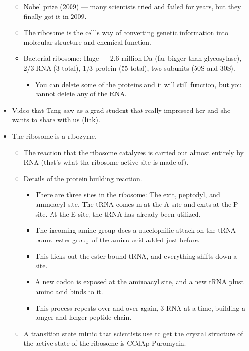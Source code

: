 \documentclass[../notes.tex]{subfiles}
\begin{document}
\begin{itemize}
    \begin{itemize}
        \item Nobel prize (2009) --- many scientists tried and failed for years, but they finally got it in 2009.
        \item The ribosome is the cell's way of converting genetic information into molecular structure and chemical function.
        \item Bacterial ribosome: Huge --- 2.6 million Da (far bigger than glycosylase), 2/3 RNA (3 total), 1/3 protein (55 total), two subunits (50S and 30S).
        \begin{itemize}
            \item You can delete some of the proteins and it will still function, but you cannot delete any of the RNA.
        \end{itemize}
    \end{itemize}
    \item Video that Tang saw as a grad student that really impressed her and she wants to share with us (\href{https://youtu.be/RedO6rLNQ2o}{link}).
    \item The ribosome is a ribozyme.
    \begin{itemize}
        \item The reaction that the ribosome catalyzes is carried out almost entirely by RNA (that's what the ribosome active site is made of).
        \item Details of the protein building reaction.
        \begin{itemize}
            \item There are three sites in the ribosome: The exit, peptodyl, and aminoacyl site. The tRNA comes in at the A site and exits at the P site. At the E site, the tRNA has already been utilized.
            \item The incoming amine group does a nucelophilic attack on the tRNA-bound ester group of the amino acid added just before.
            \item This kicks out the ester-bound tRNA, and everything shifts down a site.
            \item A new codon is exposed at the aminoacyl site, and a new tRNA plust amino acid binds to it.
            \item This process repeats over and over again, 3 RNA at a time, building a longer and longer peptide chain.
        \end{itemize}
        \item A transition state mimic that scientists use to get the crystal structure of the active state of the ribosome is CCdAp-Puromycin.

\end{itemize}
\end{itemize}
\end{document}

